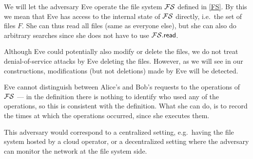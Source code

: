 We will let the adversary Eve operate the file system \(\FS\) defined in 
\cref{FS}.
By this we mean that Eve has access to the internal state of \(\FS\) directly, 
i.e.\ the set of files \(F\).
She can thus read all files (same as everyone else), but she can also do 
arbitrary searches since she does not have to use \(\fsread\).

Although Eve could potentially also modify or delete the files, we do not treat 
denial-of-service attacks by Eve deleting the files.
However, as we will see in our constructions, modifications (but not deletions) 
made by Eve will be detected.

Eve cannot distinguish between Alice's and Bob's requests to the operations of 
\(\FS\) --- in the definition there is nothing to identify who used any of the 
operations, so this is consistent with the definition.
What she can do, is to record the times at which the operations occurred, since 
she executes them.

This adversary would correspond to a centralized setting, e.g.\ having the file 
system hosted by a cloud operator, or a decentralized setting where the 
adversary can monitor the network at the file system side.

